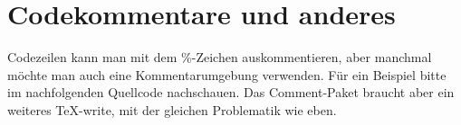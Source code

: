 \section{Codekommentare und anderes}

Codezeilen kann man mit dem \%-Zeichen auskommentieren, aber manchmal möchte man auch eine Kommentarumgebung verwenden. Für ein Beispiel bitte im nachfolgenden Quellcode nachschauen.
Das Comment-Paket braucht aber ein weiteres \TeX-write, mit der gleichen Problematik wie eben.
%
%
